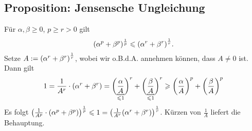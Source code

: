 \subsection{Proposition: Jensensche Ungleichung} %
\label{sub:66}
Für $\alpha,\beta \ge 0$, $p \ge r >0$ gilt 
\[
	(\alpha^p + \beta^p)^{\frac{1}{p}} \le \enbrace*{\alpha^r + \beta^r}^{\frac{1}{r}}.
\]
Setze $A := \enbrace*{\alpha^r +\beta^r}^{\frac{1}{r}}$, wobei wir o.B.d.A. annehmen können, dass $A \not= 0$ ist. Dann gilt 
\[
	1=\frac{1}{A^r} \cdot \enbrace*{\alpha^r+\beta^r} = \enbrace[\bigg]{\underbracket[0.6pt][1pt]{\frac{\alpha}{A}}_{\le 1}}^r + 
	\enbrace[\bigg]{\underbracket[0.6pt][1pt]{\frac{\beta}{A}}_{\le 1}}^r
	\ge \enbrace[\bigg]{\frac{\alpha}{A} }^p + \enbrace[\bigg]{\frac{\beta}{A} }^p    
\]
Es folgt $\enbrace*{\frac{1}{A^p} \cdot \enbrace*{\alpha^p + \beta^p}}^{\frac{1}{p} } \le 1 = \enbrace*{\frac{1}{A^r} \enbrace*{\alpha^r+ \beta^r}}^{\frac{1}{r} }$. 
Kürzen von $\frac{1}{A}$ liefert die Behauptung. \bewende

